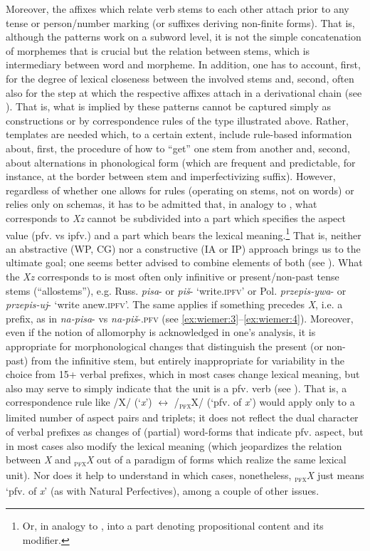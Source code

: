 \documentclass[output=paper]{langscibook}
\begin{document}
Moreover, the affixes which relate verb stems to each other attach prior to any tense or person/number marking (or suffixes deriving non-finite forms). That is, although the patterns work on a subword level, it is not the simple concatenation of morphemes that is crucial but the relation between stems, which is intermediary between word and morpheme. In addition, one has to account, first, for the degree of lexical closeness between the involved stems and, second, often also for the step at which the respective affixes attach in a derivational chain (see ). That is, what is implied by these patterns cannot be captured simply as constructions or by correspondence rules of the type illustrated above. Rather, templates are needed which, to a certain extent, include rule-based information about, first, the procedure of how to “get” one stem from another and, second, about alternations in phonological form (which are frequent and predictable, for instance, at the border between stem and imperfectivizing suffix). However, regardless of whether one allows for rules (operating on stems, not on words) or relies only on schemas, it has to be admitted that, in analogy to , what corresponds to \textit{Xz} cannot be subdivided into a part which specifies the aspect value (pfv. vs ipfv.) and a part which bears the lexical meaning.\footnote{Or, in analogy to , into a part denoting propositional content and its modifier.} That is, neither an abstractive (WP, CG) nor a constructive (IA or IP) approach brings us to the ultimate goal; one seems better advised to combine elements of both (see ). What the \textit{Xz} corresponds to is most often only infinitive or present/non-past tense stems (“allostems”), e.g. Russ. \textit{pisa}{}- or \textit{piš}{}- ‘write.\textsc{ipfv}’ or Pol. \textit{przepis-ywa}{}- or \textit{przepis-uj}{}- ‘write anew.\textsc{ipfv}’. The same applies if something precedes \textit{X}, i.e. a prefix, as in \textit{na-pisa}{}- vs \textit{na-piš}{}-.\textsc{pfv} (see \ref{ex:wiemer:3}--\ref{ex:wiemer:4}). Moreover, even if the notion of allomorphy is acknowledged in one’s analysis, it is appropriate for morphonological changes that distinguish the present (or non-past) from the infinitive stem, but entirely inappropriate for variability in the choice from 15+ verbal prefixes, which in most cases change lexical meaning, but also may serve to simply indicate that the unit is a pfv. verb (see ). That is, a correspondence rule like /X/ (‘\textit{x}’) ${\leftrightarrow}$ /\textsc{\textsubscript{pfx}}X/ (‘pfv. of \textit{x}’) would apply only to a limited number of aspect pairs and triplets; it does not reflect the dual character of verbal prefixes as changes of (partial) word-forms that indicate pfv. aspect, but in most cases also modify the lexical meaning (which jeopardizes the relation between \textit{X} and \textsc{\textsubscript{pfx}}\textit{X} out of a paradigm of forms which realize the same lexical unit). Nor does it help to understand in which cases, nonetheless, \textsc{\textsubscript{pfx}}\textit{X} just means ‘pfv. of \textit{x}’ (as with Natural Perfectives), among a couple of other issues.
\end{document}
